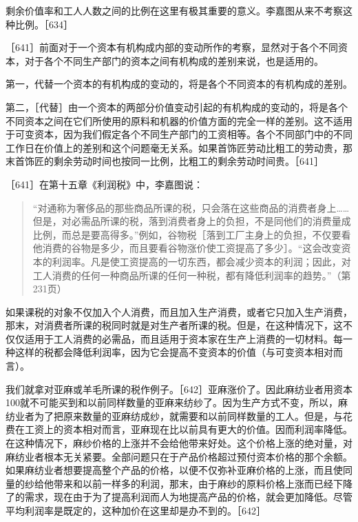 \todo{}

剩余价值率和工人人数之间的比例在这里有极其重要的意义。李嘉图从来不考察这种比例。［634］


［641］前面对于一个资本有机构成内部的变动所作的考察，显然对于各个不同资本，对于各个不同生产部门的资本之间有机构成的差别来说，也是适用的。

第一，代替一个资本的有机构成的变动的，将是各个不同资本的有机构成的差别。

第二，［代替］由一个资本的两部分价值变动引起的有机构成的变动的，将是各个不同资本之间在它们所使用的原料和机器的价值方面的完全一样的差别。这不适用于可变资本，因为我们假定各个不同生产部门的工资相等。各个不同部门中的不同工作日在价值上的差别和这个问题毫无关系。如果首饰匠劳动比粗工的劳动贵，那末首饰匠的剩余劳动时间也按同一比例，比粗工的剩余劳动时间贵。［641］


［641］在第十五章《利润税》中，李嘉图说：

\begin{quote}{“对通称为奢侈品的那些商品所课的税，只会落在这些商品的消费者身上……但是，对必需品所课的税，落到消费者身上的负担，不是同他们的消费量成比例，而总是要高得多。”例如，谷物税［落到工厂主身上的负担，不仅要看他消费的谷物是多少，而且要看谷物涨价使工资提高了多少］。“这会改变资本的利润率。凡是使工资提高的一切东西，都会减少资本的利润；因此，对工人消费的任何一种商品所课的任何一种税，都有降低利润率的趋势。”（第231页）}\end{quote}

如果课税的对象不仅加入个人消费，而且加入生产消费，或者它只加入生产消费，那末，对消费者所课的税同时就是对生产者所课的税。但是，在这种情况下，这不仅仅适用于工人消费的必需品，而且适用于资本家在生产上消费的一切材料。每一种这样的税都会降低利润率，因为它会提高不变资本的价值（与可变资本相对而言）。

我们就拿对亚麻或羊毛所课的税作例子。［642］亚麻涨价了。因此麻纺业者用资本100就不可能买到和以前同样数量的亚麻来纺纱了。因为生产方式不变，所以，麻纺业者为了把原来数量的亚麻纺成纱，就需要和以前同样数量的工人。但是，与花费在工资上的资本相对而言，亚麻现在比以前具有更大的价值。因而利润率降低。在这种情况下，麻纱价格的上涨并不会给他带来好处。这个价格上涨的绝对量，对麻纺业者根本无关紧要。全部问题只在于产品价格超过预付资本价格的那个余额。如果麻纺业者想要提高整个产品的价格，以便不仅弥补亚麻价格的上涨，而且使同量的纱给他带来和以前一样多的利润，那末，由于麻纱的原料价格上涨而已经下降了的需求，现在由于为了提高利润而人为地提高产品的价格，就会更加降低。尽管平均利润率是既定的，这种加价在这里却是办不到的。［642］

